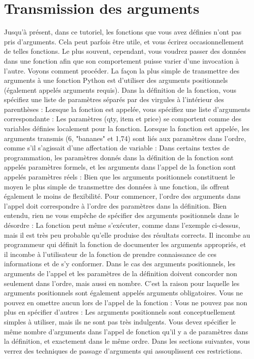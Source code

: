 \section{Transmission des arguments}
Jusqu'à présent, dans ce tutoriel, les fonctions que vous avez définies n'ont pas pris d'arguments.  Cela peut parfois être utile, et vous écrirez occasionnellement de telles fonctions. Le plus souvent, cependant, vous voudrez passer des données dans une fonction afin que son comportement puisse varier d'une invocation à l'autre. Voyons comment procéder.
La façon la plus simple de transmettre des arguments à une fonction Python est d'utiliser des arguments positionnels (également appelés arguments requis). Dans la définition de la fonction, vous spécifiez une liste de paramètres séparés par des virgules à l'intérieur des parenthèses :
Lorsque la fonction est appelée, vous spécifiez une liste d'arguments correspondante :
Les paramètres (qty, item et price) se comportent comme des variables définies localement pour la fonction.  Lorsque la fonction est appelée, les arguments transmis (6, "bananes" et 1,74) sont liés aux paramètres dans l'ordre, comme s'il s'agissait d'une affectation de variable :
Dans certains textes de programmation, les paramètres donnés dans la définition de la fonction sont appelés paramètres formels, et les arguments dans l'appel de la fonction sont appelés paramètres réels :
Bien que les arguments positionnels constituent le moyen le plus simple de transmettre des données à une fonction, ils offrent également le moins de flexibilité.  Pour commencer, l'ordre des arguments dans l'appel doit correspondre à l'ordre des paramètres dans la définition.  Bien entendu, rien ne vous empêche de spécifier des arguments positionnels dans le désordre :
La fonction peut même s'exécuter, comme dans l'exemple ci-dessus, mais il est très peu probable qu'elle produise des résultats corrects.  Il incombe au programmeur qui définit la fonction de documenter les arguments appropriés, et il incombe à l'utilisateur de la fonction de prendre connaissance de ces informations et de s'y conformer.
Dans le cas des arguments positionnels, les arguments de l'appel et les paramètres de la définition doivent concorder non seulement dans l'ordre, mais aussi en nombre. C'est la raison pour laquelle les arguments positionnels sont également appelés arguments obligatoires. Vous ne pouvez en omettre aucun lors de l'appel de la fonction :
Vous ne pouvez pas non plus en spécifier d'autres :
Les arguments positionnels sont conceptuellement simples à utiliser, mais ils ne sont pas très indulgents.  Vous devez spécifier le même nombre d'arguments dans l'appel de fonction qu'il y a de paramètres dans la définition, et exactement dans le même ordre.  Dans les sections suivantes, vous verrez des techniques de passage d'arguments qui assouplissent ces restrictions.
